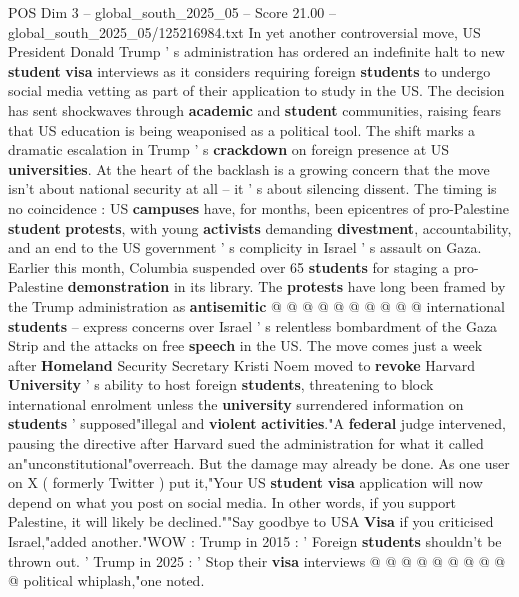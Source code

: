 \begin{textsample}{POS Dim 3 – global\_south\_2025\_05 – Score 21.00 – global\_south\_2025\_05/125216984.txt}  \label{ex:f3_pos_280}
In yet another controversial move, US President Donald Trump ' s administration has ordered an indefinite halt to new \textbf{student} \textbf{visa} interviews as it considers requiring foreign \textbf{students} to undergo social media vetting as part of their application to study in the US.
The decision has sent shockwaves through \textbf{academic} and \textbf{student} communities, raising fears that US education is being weaponised as a political tool.
The shift marks a dramatic escalation in Trump ' s \textbf{crackdown} on foreign presence at US \textbf{universities}.
At the heart of the backlash is a growing concern that the move isn't about national security at all -- it ' s about silencing dissent.
The timing is no coincidence : US \textbf{campuses} have, for months, been epicentres of pro-Palestine \textbf{student} \textbf{protests}, with young \textbf{activists} demanding \textbf{divestment}, accountability, and an end to the US government ' s complicity in Israel ' s assault on Gaza.
Earlier this month, Columbia suspended over 65 \textbf{students} for staging a pro-Palestine \textbf{demonstration} in its library.
The \textbf{protests} have long been framed by the Trump administration as \textbf{antisemitic} @ @ @ @ @ @ @ @ @ @ international \textbf{students} -- express concerns over Israel ' s relentless bombardment of the Gaza Strip and the attacks on free \textbf{speech} in the US.
The move comes just a week after \textbf{Homeland} Security Secretary Kristi Noem moved to \textbf{revoke} Harvard \textbf{University} ' s ability to host foreign \textbf{students}, threatening to block international enrolment unless the \textbf{university} surrendered information on \textbf{students} ' supposed"illegal and \textbf{violent} \textbf{activities}."A \textbf{federal} judge intervened, pausing the directive after Harvard sued the administration for what it called an"unconstitutional"overreach.
But the damage may already be done.
As one user on X ( formerly Twitter ) put it,"Your US \textbf{student} \textbf{visa} application will now depend on what you post on social media.
In other words, if you support Palestine, it will likely be declined.""Say goodbye to USA \textbf{Visa} if you criticised Israel,"added another."WOW : Trump in 2015 : ' Foreign \textbf{students} shouldn't be thrown out. ' Trump in 2025 : ' Stop their \textbf{visa} interviews @ @ @ @ @ @ @ @ @ @ political whiplash,"one noted.

\end{textsample}
